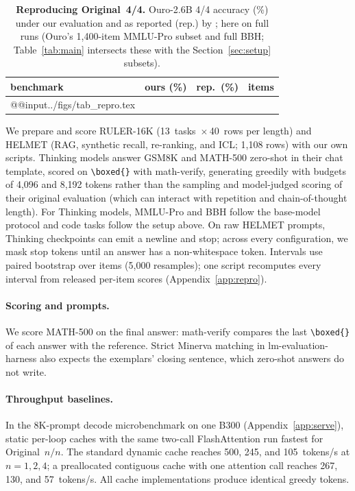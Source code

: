 \documentclass[11pt]{article}
\begin{document}
\begin{table}[h]
\centering\footnotesize
\setlength\tabcolsep{2.5pt}
\begin{tabular}{@{}lrrr@{}}
\toprule
benchmark & ours (\%) & rep.\ (\%) & items \\
\midrule
\csname @@input\endcsname ../figs/tab_repro.tex
\bottomrule
\end{tabular}
\caption{\textbf{Reproducing Original~4/4.} Ouro-2.6B 4/4 accuracy (\%) under our evaluation and as reported (rep.) by
\citet[Table~8]{ouro}; here on full runs (Ouro's 1,400-item MMLU-Pro subset and full BBH; Table~\ref{tab:main}
intersects these with the Section~\ref{sec:setup} subsets).}
\label{tab:repro}
\end{table}

We prepare and score RULER-16K (13~tasks~$\times$\,40~rows per length) and HELMET (RAG, synthetic recall, re-ranking, and
ICL; 1,108 rows) with our own scripts. Thinking models answer GSM8K and MATH-500 zero-shot in their chat template,
scored on \verb|\boxed{}| with math-verify, generating greedily with budgets of 4,096 and 8,192 tokens rather than the
sampling and model-judged scoring of their original evaluation (which can interact with repetition and chain-of-thought
length). For Thinking models, MMLU-Pro and BBH follow the base-model protocol and code tasks follow the setup above. On
raw HELMET prompts, Thinking checkpoints can emit a newline and stop; across every configuration, we mask stop tokens
until an answer has a non-whitespace token. Intervals use paired bootstrap over items (5,000 resamples); one script
recomputes every interval from released per-item scores (Appendix~\ref{app:repro}).

\paragraph{Scoring and prompts.} We score MATH-500 on the final answer: math-verify compares the last \verb|\boxed{}| of
each answer with the reference. Strict Minerva matching in lm-evaluation-harness also expects the exemplars' closing
sentence, which zero-shot answers do not write.

\paragraph{Throughput baselines.} In the 8K-prompt decode microbenchmark on one B300 (Appendix~\ref{app:serve}), static
per-loop caches with the same two-call FlashAttention run fastest for Original~$n/n$. The standard dynamic cache reaches
500, 245, and 105~\mbox{tokens/s} at $n=1,2,4$; a preallocated contiguous cache with one attention call reaches 267,
130, and 57~\mbox{tokens/s}. All cache implementations produce identical greedy tokens.
\end{document}
